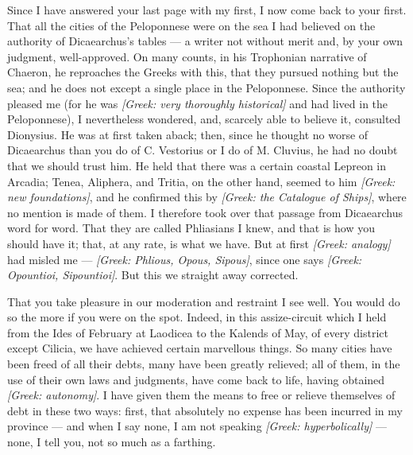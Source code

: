  Since I have answered your last page with my first, I now come back to your first. That all the cities of the Peloponnese were on the sea I had believed on the authority of Dicaearchus's tables --- a writer not without merit and, by your own judgment, well-approved. On many counts, in his Trophonian narrative of Chaeron, he reproaches the Greeks with this, that they pursued nothing but the sea; and he does not except a single place in the Peloponnese. Since the authority pleased me (for he was \textit{[Greek: very thoroughly historical]} and had lived in the Peloponnese), I nevertheless wondered, and, scarcely able to believe it, consulted Dionysius. He was at first taken aback; then, since he thought no worse of Dicaearchus than you do of C. Vestorius or I do of M. Cluvius, he had no doubt that we should trust him. He held that there was a certain coastal Lepreon in Arcadia; Tenea, Aliphera, and Tritia, on the other hand, seemed to him \textit{[Greek: new foundations]}, and he confirmed this by \textit{[Greek: the Catalogue of Ships]}, where no mention is made of them. I therefore took over that passage from Dicaearchus word for word. That they are called Phliasians I knew, and that is how you should have it; that, at any rate, is what we have. But at first \textit{[Greek: analogy]} had misled me --- \textit{[Greek: Phlious, Opous, Sipous]}, since one says \textit{[Greek: Opountioi, Sipountioi]}. But this we straight away corrected.

 That you take pleasure in our moderation and restraint I see well. You would do so the more if you were on the spot. Indeed, in this assize-circuit which I held from the Ides of February at Laodicea to the Kalends of May, of every district except Cilicia, we have achieved certain marvellous things. So many cities have been freed of all their debts, many have been greatly relieved; all of them, in the use of their own laws and judgments, have come back to life, having obtained \textit{[Greek: autonomy]}. I have given them the means to free or relieve themselves of debt in these two ways: first, that absolutely no expense has been incurred in my province --- and when I say none, I am not speaking \textit{[Greek: hyperbolically]} --- none, I tell you, not so much as a farthing.

